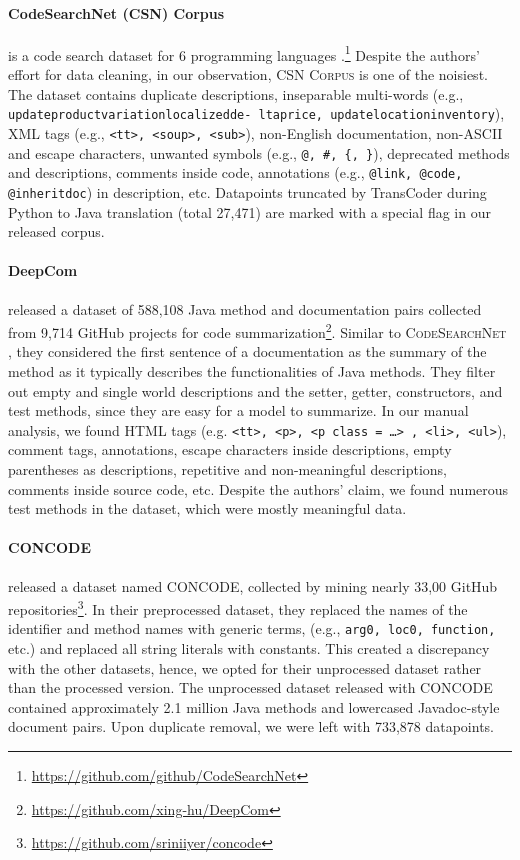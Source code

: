 \documentclass[11pt,a4paper]{article}
\begin{document}
\paragraph{CodeSearchNet (CSN) Corpus} is a code search dataset for 6 programming languages
\cite{husain2019codesearchnet}.\footnote{\href{https://github.com/github/CodeSearchNet}{https://github.com/github/CodeSearchNet}}
Despite the authors' effort for data cleaning, in our observation, \textsc{CSN Corpus} is one of the noisiest. The dataset contains duplicate descriptions, inseparable multi-words (e.g., \texttt{updateproductvariationlocalizedde- ltaprice, updatelocationinventory}), XML tags (e.g., \texttt{<tt>, <soup>, <sub>}),
non-English documentation, non-ASCII and escape characters, unwanted symbols (e.g., \texttt{@, \#, \{, \}}), deprecated methods and descriptions, comments inside code, annotations (e.g., \texttt{@link, @code, @inheritdoc}) in description, etc. Datapoints truncated by TransCoder during Python to Java translation (total 27,471) are marked with a special flag in our released corpus. 




\paragraph{DeepCom}
\citet{deepcom} released a dataset of 588,108 Java method and documentation pairs collected from 9,714 GitHub projects for code summarization\footnote{\href{https://github.com/xing-hu/DeepCom}{https://github.com/xing-hu/DeepCom}}. Similar to \textsc{CodeSearchNet} \cite{husain2019codesearchnet}, they considered the first sentence of a documentation as the summary of the method as it typically describes the functionalities of Java methods. They filter out empty and single world descriptions and the setter, getter, constructors, and test methods, since they are easy for a model to summarize. In our manual analysis, we found HTML tags (e.g. \texttt{<tt>, <p>, <p class = …> , <li>, <ul>}), comment tags, annotations, escape characters inside descriptions, empty parentheses as descriptions, repetitive and non-meaningful descriptions, comments inside source code, etc. Despite the authors' claim, we found numerous test methods in the dataset, which were mostly meaningful data.


\paragraph{CONCODE} \citet{concode} released a dataset named CONCODE, collected by mining nearly 33,00 GitHub repositories\footnote{\href{https://github.com/sriniiyer/concode}{https://github.com/sriniiyer/concode}}. In their preprocessed dataset, they replaced the names of the identifier and method names with generic terms, (e.g., \texttt{arg0, loc0, function,} etc.) and replaced all string literals with constants. This created a discrepancy with the other datasets, hence, we opted for their unprocessed dataset rather than the processed version. The unprocessed dataset released with CONCODE contained approximately 2.1 million Java methods and lowercased Javadoc-style document pairs. Upon duplicate removal, we were left with 733,878 datapoints. 
\end{document}
